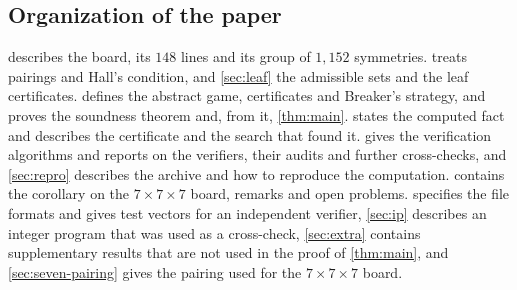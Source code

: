 \subsection{Organization of the paper}\label{ssec:intro-org}

 describes the board, its $148$ lines and its group of $1{,}152$ symmetries.
 treats pairings and Hall's condition, and \cref{sec:leaf} the admissible sets and the
leaf certificates.  defines the abstract game, certificates and Breaker's strategy, and
proves the soundness theorem and, from it, \cref{thm:main}.  states the computed
fact and describes the certificate and the search that found it.  gives the
verification algorithms and reports on the verifiers, their audits and further cross-checks, and
\cref{sec:repro} describes the archive and how to reproduce the computation. 
contains the corollary on the $7\times7\times7$ board, remarks and open problems. 
specifies the file formats and gives test vectors for an independent verifier, \cref{sec:ip} describes
an integer program that was used as a cross-check, \cref{sec:extra} contains supplementary results that
are not used in the proof of \cref{thm:main}, and \cref{sec:seven-pairing} gives the pairing used for
the $7\times7\times7$ board.

